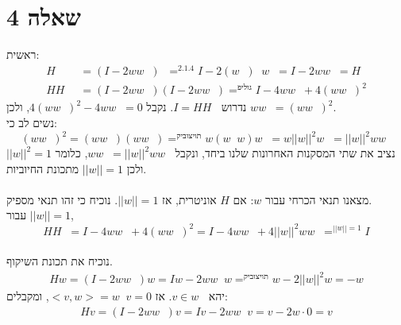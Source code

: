 \documentclass{article}
\DeclareMathOperator*{\equals}{=}
\DeclareMathOperator{\adj}{^\ast}
\DeclareMathOperator{\perc}{^\perp}
\begin{document}
\pagebreak

\section*{שאלה 4}

ראשית:
\begin{align*}
    H\adj  & = (I-2ww\adj) \adj \equals^{2.1.4}
    I - 2(w \adj) \adj w\adj = I - 2ww\adj = H            \\
    HH\adj & = (I - 2ww\adj)(I - 2ww\adj) \equals^{פילוג}
    I - 4ww\adj + 4 (ww\adj)^2
\end{align*}
נדרוש $I=HH\adj$. נקבל $4(ww\adj)^2 - 4ww\adj=0$, ולכן $ww\adj = (ww\adj)^2$. \\
נשים לב כי:
\[
    (ww\adj)^2=(ww\adj) (w w\adj)\equals^{קיבוציות}w(w\adj w)w\adj=w||w||^2w\adj = ||w||^2 ww\adj
\]
נציב את שתי המסקנות האחרונות שלנו ביחד, ונקבל $ww\adj = ||w||^2ww\adj$, כלומר $||w||^2=1$ ולכן $||w||=1$ מתכונת החיוביות.\\\\
מצאנו תנאי הכרחי עבור $w$: אם $H$ אוניטרית, אז $||w||=1$. נוכיח כי זהו תנאי מספיק.\\
עבור $||w||=1$,
\[
    HH\adj = I - 4ww\adj + 4 (ww\adj)^2=I-4ww\adj + 4||w||^2ww\adj \equals^{||w||=1}I
\]
\\
נוכיח את תכונת השיקוף.
\begin{align*}
    Hw=(I-2ww\adj)w=Iw-2ww\adj w \equals^{קיבוציות} w - 2||w||^2w=-w
\end{align*}
יהא $v\in {w}\perc$. אז $<v,w>=w\adj v = 0$, ומקבלים:
\begin{align*}
    Hv=(I-2ww\adj)v=Iv-2ww\adj v = v - 2w\cdot 0 = v
\end{align*}
\end{document}
